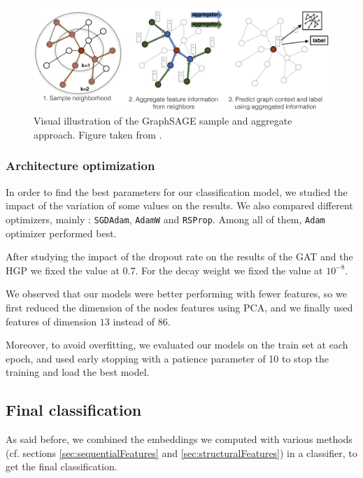 \documentclass[final]{cvpr}
\begin{document}
\begin{figure}[h]
    \centering
    \includegraphics[width=\columnwidth]{figures/graphSageArchitecture.png}
    \caption{Visual illustration of the GraphSAGE sample and aggregate approach. Figure taken from \cite{graphsage}.}
    \label{fig:graphSage}
\end{figure}

\subsubsection{Architecture optimization}

In order to find the best parameters for our classification model, we studied the impact of the variation of some values on the results. We also compared different optimizers, mainly : \texttt{SGD}\texttt{Adam}, \texttt{AdamW} and \texttt{RSProp}. Among all of them, \texttt{Adam} optimizer performed best.

After studying the impact of the dropout rate on the results of the GAT and the HGP we fixed the value at 0.7. For the decay weight we fixed the value at $10^{-8}$.

We observed that our models were better performing with fewer features, so we first reduced the dimension of the nodes features using PCA, and we finally used features of dimension $13$ instead of $86$.

Moreover, to avoid overfitting, we evaluated our models on the train set at each epoch, and used early stopping with a patience parameter of 10 to stop the training and load the best model.

\subsection{Final classification} \label{sec:theClassifier}

As said before, we combined the embeddings we computed with various methods (cf. sections \ref{sec:sequentialFeatures}
 and \ref{sec:structuralFeatures}) in a classifier, to get the final classification.
 
\end{document}
